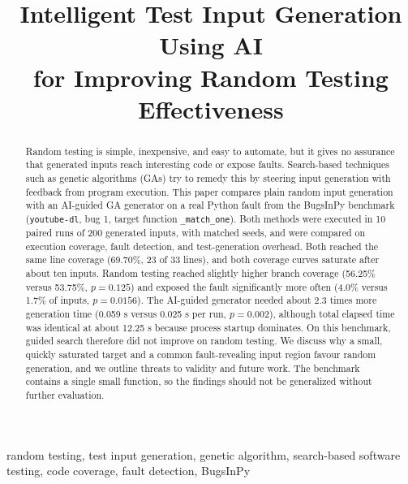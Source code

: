 \documentclass[12pt,onecolumn]{IEEEtran}
\begin{document}
\title{Intelligent Test Input Generation Using AI\\
for Improving Random Testing Effectiveness}

\author{
}

\maketitle

\begin{abstract}
Random testing is simple, inexpensive, and easy to automate, but it gives no assurance that generated inputs reach interesting code or expose faults. Search-based techniques such as genetic algorithms (GAs) try to remedy this by steering input generation with feedback from program execution. This paper compares plain random input generation with an AI-guided GA generator on a real Python fault from the BugsInPy benchmark (\texttt{youtube-dl}, bug 1, target function \texttt{\_match\_one}). Both methods were executed in 10 paired runs of 200 generated inputs, with matched seeds, and were compared on execution coverage, fault detection, and test-generation overhead. Both reached the same line coverage (69.70\%, 23 of 33 lines), and both coverage curves saturate after about ten inputs. Random testing reached slightly higher branch coverage (56.25\% versus 53.75\%, $p=0.125$) and exposed the fault significantly more often (4.0\% versus 1.7\% of inputs, $p=0.0156$). The AI-guided generator needed about 2.3 times more generation time (0.059 s versus 0.025 s per run, $p=0.002$), although total elapsed time was identical at about 12.25 s because process startup dominates. On this benchmark, guided search therefore did not improve on random testing. We discuss why a small, quickly saturated target and a common fault-revealing input region favour random generation, and we outline threats to validity and future work. The benchmark contains a single small function, so the findings should not be generalized without further evaluation.
\end{abstract}

\begin{IEEEkeywords}
random testing, test input generation, genetic algorithm, search-based software testing, code coverage, fault detection, BugsInPy
\end{IEEEkeywords}
\end{document}

